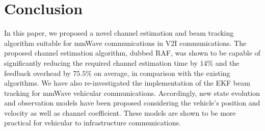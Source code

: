 \documentclass{ieeeaccess}
\begin{document}
\section{Conclusion }\label{conclusion}
In this paper, we proposed a novel channel estimation and beam tracking algorithm suitable for mmWave communications in V2I communications. The proposed channel estimation algorithm, dubbed RAF, was shown to be capable of significantly reducing the required channel estimation time by $14\%$ and the feedback overhead by $75.5\%$ on average, in comparison with the existing algorithms. We have also re-investigated the implementation of the EKF beam tracking for mmWave vehicular communications. Accordingly, new state evolution and observation models have been proposed considering the vehicle's position and velocity as well as channel coefficient. These models are shown to be more practical for vehicular to infrastructure communications.



\EOD
\end{document}
